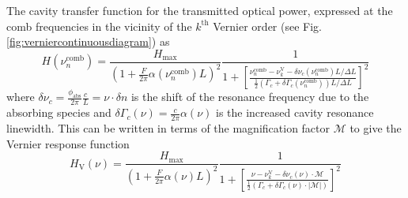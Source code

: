 \documentclass[8pt,a4paper]{report}
\begin{document}
	The cavity transfer function for the transmitted optical power, expressed at the comb frequencies in the vicinity of the $k^\mathrm{th}$ Vernier order (see Fig. \ref{fig:verniercontinuousdiagram}) as
	\begin{equation}
		H(\nu_n^\mathrm{comb}) = \frac{H_\mathrm{max}}{\left(1 + \frac{F}{2\pi}\alpha\left(\nu_n^\mathrm{comb} \right)L\right)^2} \frac{1}{1 + \left[\frac{\nu_n^\mathrm{comb} - \nu_k^\mathrm{V} - \delta \nu_c(\nu_n^\mathrm{comb}) L/\Delta L}{\frac{1}{2}\left(\Gamma_c + \delta \Gamma_c(\nu_n^\mathrm{comb})\right) L/\Delta L}\right]^2}
	\end{equation}
	where $\delta\nu_c = \frac{\phi_\mathrm{abs}}{2\pi}\frac{c}{L} = \nu \cdot\delta n$ is the shift of the resonance frequency due to the absorbing species and $\delta\Gamma_c(\nu) = \frac{c}{2\pi}\alpha(\nu)$ is the increased cavity resonance linewidth. This can be written in terms of the magnification factor $\mathcal{M}$ to give the Vernier response function \cite{vernier_continuous_filtering}
	\begin{equation}
		H_\mathrm{V}(\nu) =
		\frac{H_\mathrm{max}}{\left(1 + \frac{F}{2\pi}\alpha\left(\nu \right)L\right)^2}
		\frac{1}{1 + \left[\frac{\nu - \nu_k^\mathrm{V} - \delta \nu_c(\nu)\cdot\mathcal{M}}{\frac{1}{2}\left(\Gamma_c + \delta \Gamma_c(\nu)\cdot\left|\mathcal{M}\right|\right)}\right]^2}
	\end{equation}
	
	
\end{document}
